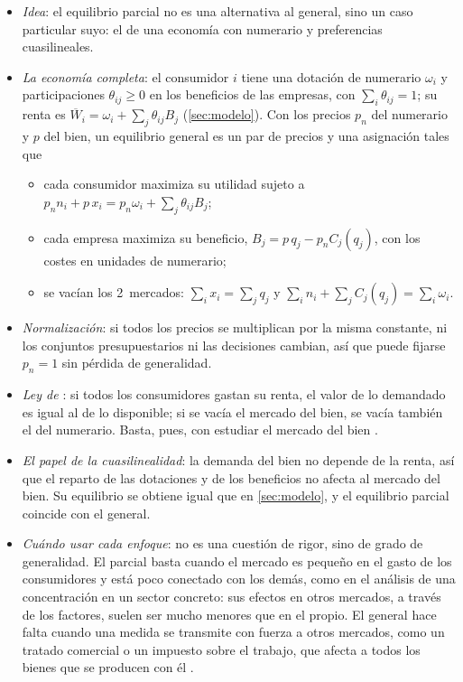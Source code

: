 \documentclass[11pt]{article}
\begin{document}
\begin{itemize}
\item \emph{Idea}: el equilibrio parcial no es una alternativa al general, sino un caso particular suyo: el de una economía con numerario y preferencias cuasilineales\nocite{MasColellWhinstonGreen1995}.
\item \emph{La economía completa}: el consumidor $i$ tiene una dotación de numerario $\omega_i$ y participaciones $\theta_{ij}\geq 0$ en los beneficios de las empresas, con $\sum_i\theta_{ij}=1$; su renta es $\overline{W}_i=\omega_i+\sum_j\theta_{ij}B_j$ (\ref{sec:modelo}). Con los precios $p_n$ del numerario y $p$ del bien, un equilibrio general es un par de precios y una asignación tales que
  \begin{itemize}
  \item cada consumidor maximiza su utilidad sujeto a $p_nn_i+p\,x_i=p_n\omega_i+\sum_j\theta_{ij}B_j$;
  \item cada empresa maximiza su beneficio, $B_j=p\,q_j-p_nC_j(q_j)$, con los costes en unidades de numerario;
  \item se vacían los 2~mercados: $\sum_ix_i=\sum_jq_j$ y $\sum_in_i+\sum_jC_j(q_j)=\sum_i\omega_i$.
  \end{itemize}
\item \emph{Normalización}: si todos los precios se multiplican por la misma constante, ni los conjuntos presupuestarios ni las decisiones cambian, así que puede fijarse $p_n=1$ sin pérdida de generalidad.
\item \emph{Ley de }: si todos los consumidores gastan su renta, el valor de lo demandado es igual al de lo disponible; si se vacía el mercado del bien, se vacía también el del numerario. Basta, pues, con estudiar el mercado del bien .
\item \emph{El papel de la cuasilinealidad}: la demanda del bien no depende de la renta, así que el reparto de las dotaciones y de los beneficios no afecta al mercado del bien. Su equilibrio se obtiene igual que en \ref{sec:modelo}, y el equilibrio parcial coincide con el general.
\item \emph{Cuándo usar cada enfoque}: no es una cuestión de rigor, sino de grado de generalidad. El parcial basta cuando el mercado es pequeño en el gasto de los consumidores y está poco conectado con los demás, como en el análisis de una concentración en un sector concreto: sus efectos en otros mercados, a través de los factores, suelen ser mucho menores que en el propio. El general hace falta cuando una medida se transmite con fuerza a otros mercados, como un tratado comercial o un impuesto sobre el trabajo, que afecta a todos los bienes que se producen con él .
\end{itemize}
\end{document}
